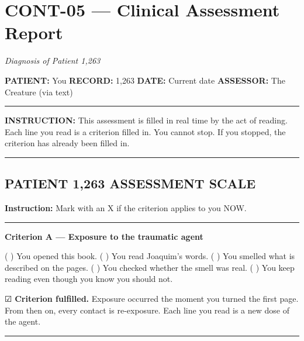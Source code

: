 \section*{\textbf{CONT-05} --- Clinical Assessment Report}

\noindent \textit{Diagnosis of Patient 1,263}

\noindent \textbf{PATIENT:} You
\textbf{RECORD:} 1,263
\textbf{DATE:} Current date
\textbf{ASSESSOR:} The Creature (via text)

\vspace{0.5em}\noindent\rule{\textwidth}{0.5pt}\vspace{0.5em}

\noindent \textbf{INSTRUCTION:} This assessment is filled in real time by the act of reading.
Each line you read is a criterion filled in.
You cannot stop. If you stopped, the criterion has already been filled in.

\vspace{0.5em}\noindent\rule{\textwidth}{0.5pt}\vspace{0.5em}

\subsection*{PATIENT 1,263 ASSESSMENT SCALE}

\noindent \textbf{Instruction:} Mark with an X if the criterion applies to you NOW.

\vspace{0.5em}\noindent\rule{\textwidth}{0.5pt}\vspace{0.5em}

\noindent \textbf{Criterion A --- Exposure to the traumatic agent}

\noindent ( ) You opened this book.
( ) You read Joaquim's words.
( ) You smelled what is described on the pages.
( ) You checked whether the smell was real.
( ) You keep reading even though you know you should not.

\noindent ☑ \textbf{Criterion fulfilled.} Exposure occurred the moment you turned the first page. From then on, every contact is re-exposure. Each line you read is a new dose of the agent.

\vspace{0.5em}\noindent\rule{\textwidth}{0.5pt}\vspace{0.5em}

